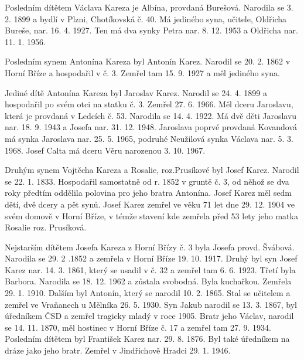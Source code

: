 \documentclass[../dejiny-rodu-prusiku.tex]{subfiles}
\begin{document}
Posledním dítětem Václava Kareza je Albína, provdaná Burešová. Narodila se 3. 2. 1899 a bydlí v Plzni, Chotíkovská č. 40. Má jediného syna, učitele, Oldřicha Bureše, nar. 16. 4. 1927. Ten má dva synky Petra nar. 8. 12. 1953 a Oldři­cha nar. 11. 1. 1956.

Posledním synem Antonína Kareza byl Antonín Karez. Narodil se 20. 2. 1862 v Horní Bříze a hospodařil v č. 3. Zemřel tam 15. 9. 1927 a měl jediného syna.

Jediné dítě Antonína Kareza byl Jaroslav Karez. Narodil se 24. 4. 1899 a hospodařil po svém otci na statku č. 3. Zemřel 27. 6. 1966. Měl dceru Jaroslavu, která je provdaná v Ledcích č. 53. Narodila se 14. 4. 1922. Má dvě děti Jaroslavu nar. 18. 9. 1943 a Josefa nar. 31. 12. 1948. Jaroslava poprvé provdaná Kovandová má synka Jaroslava nar. 25. 5. 1965, podruhé Neužilová synka Václava nar. 5. 3. 1968. Josef Calta má dceru Věru narozenou 3. 10. 1967.

Druhým synem Vojtěcha Kareza a Rosalie, roz.Prusíkové byl Josef Karez. Narodil se 22. 1. 1833. Hospodařil samo­statně od r. 1852 v gruntě č. 3, od něhož se dva roky předtím oddělila polovina pro jeho bratra Antonína. Josef Karez měl sedm dětí, dvě dcery a pět synů. Josef Karez zemřel ve věku 71 let dne 29. 12. 1904 ve svém domo­vě v Horní Bříze, v témže stavení kde zemřela před 53 lety jeho matka Rosalie roz. Prusíková.

Nejstarším dítětem Josefa Kareza z Horní Břízy č. 3 byla Josefa provd. Švábová. Narodila se 29. 2 .1852 a zemřela v Horní Bříze 19. 10. 1917. Druhý byl syn Josef Karez nar. 14. 3. 1861, který se usadil v č. 32 a zem­řel tam 6. 6. 1923. Třetí byla Barbora. Narodila se 18. 12. 1962 a zůstala svobodná. Byla kuchařkou. Zemřela 29. 1. 1910. Dalším byl Antonín, který se narodil 10. 2. 1865.  Stal se učitelem a zemřel ve Vraňanech u Měl­níka 26. 5. 1930. Syn Jakub narodil se 13. 3. 1867, byl úředníkem ČSD a zemřel tragicky mladý v roce 1905. Bratr jeho Václav, narodil se 14. 11. 1870, měl hostinec v Horní Bříze č. 17 a zemřel tam 27. 9. 1934. Posledním dítětem byl František Karez  nar. 29. 8. 1876. Byl také úředníkem na dráze jako jeho bratr. Zemřel v Jindřicho­vě Hradci 29. 1. 1946.
\end{document}
